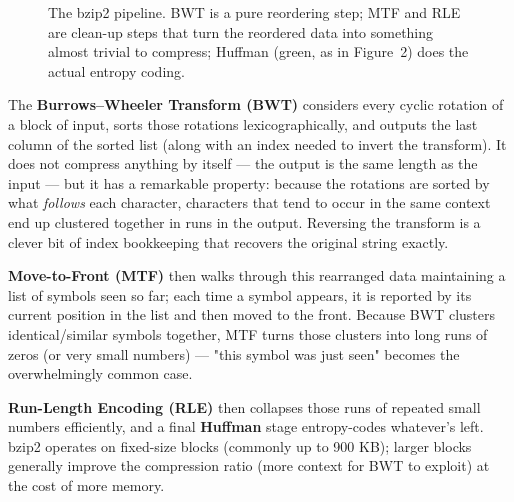 \documentclass[11pt]{article}
\begin{document}
\begin{figure}[h]
\centering
{}
\caption{The bzip2 pipeline. BWT is a pure reordering step; MTF and RLE are clean-up steps that turn the reordered data into something almost trivial to compress; Huffman (green, as in Figure~2) does the actual entropy coding.}
\end{figure}

The \textbf{Burrows--Wheeler Transform (BWT)} considers every cyclic rotation of a block of input, sorts those rotations lexicographically, and outputs the last column of the sorted list (along with an index needed to invert the transform). It does not compress anything by itself — the output is the same length as the input — but it has a remarkable property: because the rotations are sorted by what \emph{follows} each character, characters that tend to occur in the same context end up clustered together in runs in the output. Reversing the transform is a clever bit of index bookkeeping that recovers the original string exactly.

\textbf{Move-to-Front (MTF)} then walks through this rearranged data maintaining a list of symbols seen so far; each time a symbol appears, it is reported by its current position in the list and then moved to the front. Because BWT clusters identical/similar symbols together, MTF turns those clusters into long runs of zeros (or very small numbers) — "this symbol was just seen" becomes the overwhelmingly common case.

\textbf{Run-Length Encoding (RLE)} then collapses those runs of repeated small numbers efficiently, and a final \textbf{Huffman} stage entropy-codes whatever's left. bzip2 operates on fixed-size blocks (commonly up to 900 KB); larger blocks generally improve the compression ratio (more context for BWT to exploit) at the cost of more memory.
\end{document}
